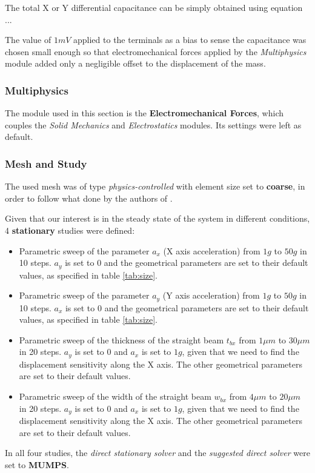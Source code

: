 \documentclass[lettersize,journal]{IEEEtran}
\begin{document}
        The total X or Y differential capacitance can be simply obtained using equation ...
        
        The value of \(1mV\) applied to the terminals as a bias to sense the capacitance was chosen small enough so that electromechanical forces applied by the \textit{Multiphysics} module added only a negligible offset to the displacement of the mass.
        
        \bigskip
        \subsubsection{Multiphysics}
        The module used in this section is the \textbf{Electromechanical Forces}, which couples the \textit{Solid Mechanics} and \textit{Electrostatics} modules. Its settings were left as default.
        
        \bigskip
        \subsubsection{Mesh and Study}
        The used mesh was of type \textit{physics-controlled} with element size set to \textbf{coarse}, in order to follow what done by the authors of \cite{original}.
        
        Given that our interest is in the steady state of the system in different conditions, 4 \textbf{stationary} studies were defined:
        \begin{itemize}
            \item Parametric sweep of the parameter \(a_x\) (X axis acceleration) from \(1g\) to \(50g\) in 10 steps. \(a_y\) is set to 0 and the geometrical parameters are set to their default values, as specified in table \ref{tab:size}.
            \item Parametric sweep of the parameter \(a_y\) (Y axis acceleration) from \(1g\) to \(50g\) in 10 steps. \(a_x\) is set to 0 and the geometrical parameters are set to their default values, as specified in table \ref{tab:size}.
            \item Parametric sweep of the thickness of the straight beam \(t_{bx}\) from \(1\mu m\) to \(30\mu m\) in 20 steps. \(a_y\) is set to 0 and \(a_x\) is set to \(1g\), given that we need to find the displacement sensitivity along the X axis. The other geometrical parameters are set to their default values.
            \item Parametric sweep of the width of the straight beam \(w_{bx}\) from \(4\mu m\) to \(20\mu m\) in 20 steps. \(a_y\) is set to 0 and \(a_x\) is set to \(1g\), given that we need to find the displacement sensitivity along the X axis. The other geometrical parameters are set to their default values.
        \end{itemize}
        In all four studies, the \textit{direct stationary solver} and the \textit{suggested direct solver} were set to \textbf{MUMPS}.
        
\end{document}
